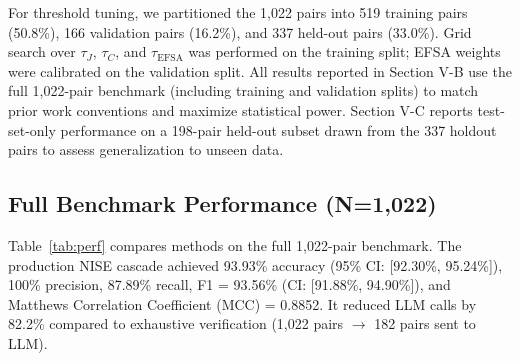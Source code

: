 \documentclass[conference]{IEEEtran}
\begin{document}
For threshold tuning, we partitioned the 1,022 pairs into 519 training pairs (50.8\%), 166 validation pairs (16.2\%), and 337 held-out pairs (33.0\%).
Grid search over $\tau_J$, $\tau_C$, and $\tau_{\text{EFSA}}$ was performed on the training split; EFSA weights were calibrated on the validation split.
All results reported in Section V-B use the full 1,022-pair benchmark (including training and validation splits) to match prior work conventions and maximize statistical power.
Section V-C reports test-set-only performance on a 198-pair held-out subset drawn from the 337 holdout pairs to assess generalization to unseen data.

\subsection{Full Benchmark Performance (N=1,022)}
Table~\ref{tab:perf} compares methods on the full 1,022-pair benchmark.
The production NISE cascade achieved 93.93\% accuracy (95\% CI: [92.30\%, 95.24\%]), 100\% precision, 87.89\% recall, F1 = 93.56\% (CI: [91.88\%, 94.90\%]), and Matthews Correlation Coefficient (MCC) = 0.8852.
It reduced LLM calls by 82.2\% compared to exhaustive verification (1,022 pairs $\to$ 182 pairs sent to LLM).

\begin{table}[!t]
\centering
\caption{Comparative Performance on Full 1,022-Pair Benchmark}
\label{tab:perf}
\end{table}
\end{document}
